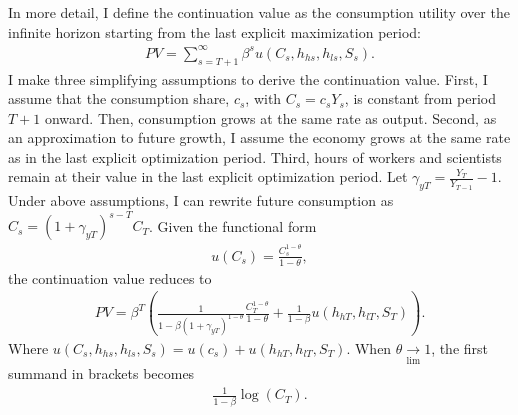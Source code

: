 In more detail, I define the continuation value as the consumption utility over the infinite horizon starting from the last explicit maximization period:
\begin{align*}
PV=\sum_{s=T+1}^{\infty} \beta^{s}u(C_s, h_{hs}, h_{ls}, S_{s}).
\end{align*}
I make three simplifying assumptions to derive the continuation value. First, 
I assume that the consumption share, $c_s$, with $C_s=c_sY_s$, is constant from period $T+1$ onward.  Then, consumption grows at the same rate as output. 
Second, as an approximation to future growth, I assume the economy grows at the same rate as in the last explicit optimization period. Third, hours of workers and scientists remain at their value in the last explicit optimization period. %
Let $\gamma_{yT}=\frac{Y_{T}}{Y_{T-1}}-1$. Under above assumptions, I can rewrite future consumption as $C_s=(1+\gamma_{yT})^{s-T}C_{T}$.
Given the functional form
\begin{align*}
u(C_s)= \frac{C_s^{1-\theta}}{1-\theta},
\end{align*}
the continuation value reduces to
\begin{align*}
PV= \beta^{T}\left(\frac{1}{1-\beta (1+\gamma_{yT})^{1-\theta}}\frac{C_{T}^{1-\theta}}{1-\theta}+ \frac{1}{1-\beta}u(h_{hT}, h_{lT}, S_T)\right).
\end{align*}
Where $u(C_s, h_{hs}, h_{ls}, S_{s})=u(c_s)+u(h_{hT}, h_{lT}, S_T)$.
When $\theta\underset{\lim}{\rightarrow} 1$,  the first summand in brackets becomes
\begin{align*}
\frac{1}{1-\beta}\log(C_{T}).
\end{align*}

%

